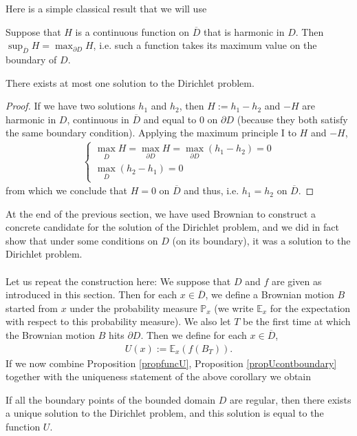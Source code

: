 \documentclass[../mainfile.tex]{subfiles}
\begin{document}
\newpage
Here is a simple classical result that we will use
\begin{lem} Suppose that $H$ is a continuous function on $\overline{D}$ that is harmonic in $D$. Then $\sup_{\overline{D}} H= \max_{\partial D} H$, i.e. such a function takes its maximum value on the boundary of $D$. 
\end{lem}
\begin{cor} There exists at most one solution to the Dirichlet problem. 
\end{cor}
\begin{proof}
If we have two solutions $h_1$ and $h_2$, then $H:=h_1-h_2$ and $-H$ are harmonic in $D$, continuous in $\overline{D}$ and equal to $0$ on $\partial D$ (because they both satisfy the same boundary condition). Applying the maximum principle I to $H$ and $-H$, 
\begin{align*}
\begin{cases} \max_{\overline{D}}H= \max_{\partial D} H= \max_{ \partial D} (h_1-h_2) =0 \\ \max_{\overline{D}} (h_2-h_1)=0
\end{cases}
\end{align*}
from which we conclude that $H=0$ on $\overline{D}$ and thus, i.e. $h_1=h_2$ on $\overline{D}$. 
\end{proof}
At the end of the previous section, we have used Brownian to construct a concrete candidate for the solution of the Dirichlet problem, and we did in fact show that under some conditions on $D$ (on its boundary), it was a solution to the Dirichlet problem.
\\\\ Let us repeat the construction here: We suppose that $D$ and $f$ are given as introduced in this section. Then for each $x \in \overline{D}$, we define a Brownian motion $B$ started from $x$ under the probability measure $\mathbb{P}_x$ (we write $\mathbb{E}_x$ for the expectation with respect to this probability measure). We also let $T$ be the first time at which the Brownian motion $B$ hits $\partial D$. Then we define for each $x \in \overline{D}$, 
\begin{align*}
U(x):= \mathbb{E}_x(f(B_T)).
\end{align*}
If we now combine Proposition \ref{propfuncU}, Proposition \ref{propUcontboundary} together with the uniqueness statement of the above corollary we obtain
\begin{thm} If all the boundary points of the bounded domain $D$ are regular, then there exists a unique solution to the Dirichlet problem, and this solution is equal to the function $U$. 
\end{thm}
\end{document}
